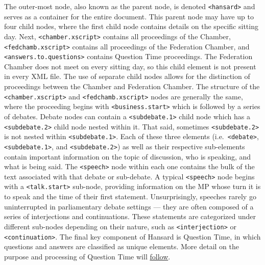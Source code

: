 \documentclass[
  letterpaper,
  DIV=11,
  numbers=noendperiod]{scrartcl}
\begin{document}
The outer-most node, also known as the parent node, is denoted
\texttt{\textless{}hansard\textgreater{}} and serves as a container for
the entire document. This parent node may have up to four child nodes,
where the first child node contains details on the specific sitting day.
Next, \texttt{\textless{}chamber.xscript\textgreater{}} contains all
proceedings of the Chamber,
\texttt{\textless{}fedchamb.xscript\textgreater{}} contains all
proceedings of the Federation Chamber, and
\texttt{\textless{}answers.to.questions\textgreater{}} contains Question
Time proceedings. The Federation Chamber does not meet on every sitting
day, so this child element is not present in every XML file. The use of
separate child nodes allows for the distinction of proceedings between
the Chamber and Federation Chamber. The structure of the
\texttt{\textless{}chamber.xscript\textgreater{}} and
\texttt{\textless{}fedchamb.xscript\textgreater{}} nodes are generally
the same, where the proceeding begins with
\texttt{\textless{}business.start\textgreater{}} which is followed by a
series of debates. Debate nodes can contain a
\texttt{\textless{}subdebate.1\textgreater{}} child node which has a
\texttt{\textless{}subdebate.2\textgreater{}} child node nested within
it. That said, sometimes \texttt{\textless{}subdebate.2\textgreater{}}
is not nested within \texttt{\textless{}subdebate.1\textgreater{}}. Each
of these three elements (i.e.~\texttt{\textless{}debate\textgreater{}},
\texttt{\textless{}subdebate.1\textgreater{}}, and
\texttt{\textless{}subdebate.2\textgreater{}}) as well as their
respective sub-elements contain important information on the topic of
discussion, who is speaking, and what is being said. The
\texttt{\textless{}speech\textgreater{}} node within each one contains
the bulk of the text associated with that debate or sub-debate. A
typical \texttt{\textless{}speech\textgreater{}} node begins with a
\texttt{\textless{}talk.start\textgreater{}} sub-node, providing
information on the MP whose turn it is to speak and the time of their
first statement. Unsurprisingly, speeches rarely go uninterrupted in
parliamentary debate settings --- they are often composed of a series of
interjections and continuations. These statements are categorized under
different sub-nodes depending on their nature, such as
\texttt{\textless{}interjection\textgreater{}} or
\texttt{\textless{}continuation\textgreater{}}. The final key component
of Hansard is Question Time, in which questions and answers are
classified as unique elements. More detail on the purpose and processing
of Question Time will \protect\hyperlink{sec-qa}{follow}.
\end{document}
